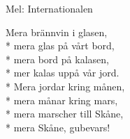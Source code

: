 \begin{SongText}
    \begin{SongInfo}
        Mel: Internationalen
    \end{SongInfo}
    \begin{SongVerse}
        Mera brännvin i glasen,\\*%
        mera glas på vårt bord,\\*%
        mera bord på kalasen,\\*%
        mer kalas uppå vår jord.\\*%
        Mera jordar kring månen,\\*%
        mera månar kring mars,\\*%
        mera marscher till Skåne,\\*%
        mera Skåne, gubevars!
    \end{SongVerse}
\end{SongText}